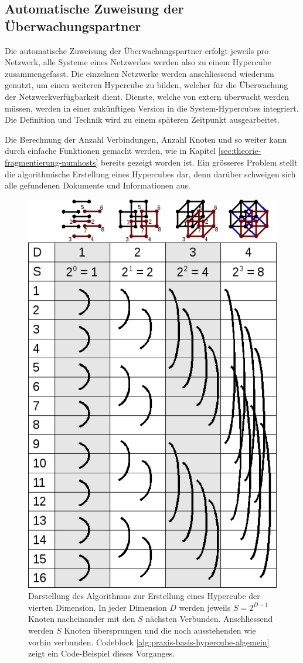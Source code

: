 \subsection{Automatische Zuweisung der \"Uberwachungspartner} \label{sec:praxis-basis-partner}
Die automatische Zuweisung der \"Uberwachungspartner erfolgt jeweils pro Netzwerk, alle Systeme eines Netzwerkes werden also zu einem Hypercube zusammengefasst. Die einzelnen Netzwerke werden anschliessend wiederum genutzt, um einen weiteren Hypercube zu bilden, welcher f\"ur die \"Uberwachung der Netzwerkverf\"ugbarkeit dient. Dienste, welche von extern \"uberwacht werden m\"ussen, werden in einer zuk\"unftigen Version in die System-Hypercubes integriert. Die Definition und Technik wird zu einem sp\"ateren Zeitpunkt ausgearbeitet.

Die Berechnung der Anzahl Verbindungen, Anzahl Knoten und so weiter kann durch einfache Funktionen gemacht werden, wie in Kapitel \ref{sec:theorie-fragmentierung-numhosts} bereits gezeigt worden ist. Ein gr\"osseres Problem stellt die algorithmische Erstellung eines Hypercubes dar, denn dar\"uber schweigen sich alle gefundenen Dokumente und Informationen aus.

\begin{figure}[h]
  \centering
  \includegraphics[width=0.5\linewidth]{images/theorie/hyper-build}
  \caption[Visuelle Darstellung des Algorithmus zur Erstellung eines Hypercube]{Darstellung des Algorithmus zur Erstellung eines Hypercube der vierten Dimension. In jeder Dimension $D$ werden jeweils $S = 2^{D-1}$ Knoten nacheinander mit den $S$ n\"achsten Verbunden. Anschliessend werden $S$ Knoten \"ubersprungen und die noch ausstehenden wie vorhin verbunden. Codeblock \ref{alg:praxis-basis-hypercube-algemein} zeigt ein Code-Beispiel dieses Vorganges.}
  \label{fig:praxis-basis-hypercube}
\end{figure}

